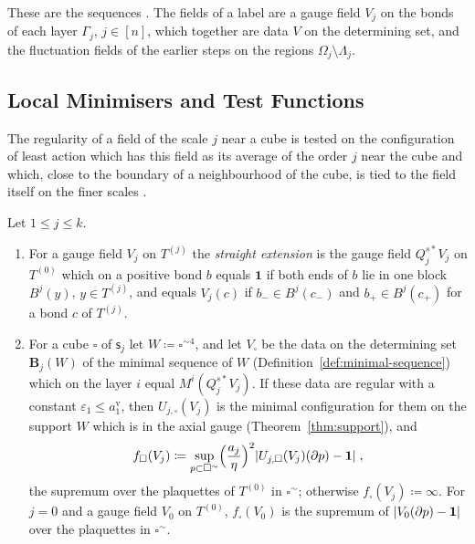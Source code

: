 \documentclass[11pt]{preprint}
\newcommand{\id}{\mathbf 1}
\DeclarePairedDelimiter{\abs}{\lvert}{\rvert}
\numberwithin{equation}{section}
\begin{document}
These are the sequences \cite[(2.1)--(2.3), pp.~254--255]{BalabanCRE}. The fields of a label are a gauge field $V_j$ on the bonds of each layer $\Gamma_j$, $j \in [n]$, which together are data $V$ on the determining set, and the fluctuation fields of the earlier steps on the regions $\Omega_j \setminus \Lambda_j$.

\subsection{Local Minimisers and Test Functions}\label{sec:test-functions}

The regularity of a field of the scale $j$ near a cube is tested on the configuration of least action which has this field as its average of the order $j$ near the cube and which, close to the boundary of a neighbourhood of the cube, is tied to the field itself on the finer scales \cite[(2.13)--(2.17), pp.~256--257]{BalabanCRE}.

\begin{definition}\label{def:cube-minimiser}
Let $1 \leqslant j \leqslant k$.
\begin{enumerate}[label=(\roman*)]
\item For a gauge field $V_j$ on $T^{(j)}$ the \emph{straight extension} is the gauge field $Q^{s*}_jV_j$ on $T^{(0)}$ which on a positive bond $b$ equals $\id$ if both ends of $b$ lie in one block $B^j(y)$, $y \in T^{(j)}$, and equals $V_j(c)$ if $b_- \in B^j(c_-)$ and $b_+ \in B^j(c_+)$ for a bond $c$ of $T^{(j)}$.
\item For a cube $\square$ of $\mathsf s_j$ let $W \coloneqq \square^{\sim4}$, and let $V_{\square}$ be the data on the determining set $\mathbf B_j(W)$ of the minimal sequence of $W$ (Definition~\ref{def:minimal-sequence}) which on the layer $i$ equal $M^i(Q^{s*}_jV_j)$. If these data are regular with a constant $\varepsilon_1 \leqslant a^{\mathrm v}_1$, then $U_{j,\square}(V_j)$ is the minimal configuration for them on the support $W$ which is in the axial gauge (Theorem~\ref{thm:support}), and
\begin{equation}\label{eq:plaquette-test}
    f_\square(V_j) \coloneqq \sup_{p \subset \square^\sim}\Bigl(\frac{a_j}{\eta}\Bigr)^2\abs{U_{j,\square}(V_j)(\partial p) - \id}\;,
\end{equation}
the supremum over the plaquettes of $T^{(0)}$ in $\square^\sim$; otherwise $f_\square(V_j) \coloneqq \infty$. For $j = 0$ and a gauge field $V_0$ on $T^{(0)}$, $f_\square(V_0)$ is the supremum of $\abs{V_0(\partial p) - \id}$ over the plaquettes in $\square^\sim$.
\end{enumerate}
\end{definition}
\end{document}
